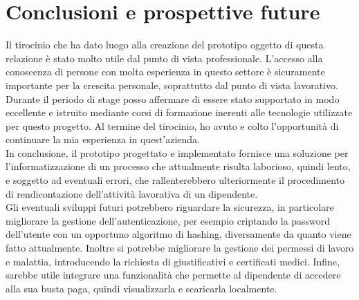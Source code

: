 \chapter{Conclusioni e prospettive future} \label{chapter:end}
Il tirocinio che ha dato luogo alla creazione del prototipo oggetto di questa relazione è stato molto utile dal punto di vista professionale. L'accesso alla conoscenza di persone con molta esperienza in questo settore è sicuramente importante per la crescita personale, soprattutto dal punto di vista lavorativo. Durante il periodo di stage posso affermare di essere stato supportato in modo eccellente e istruito mediante corsi di formazione inerenti alle tecnologie utilizzate per questo progetto. Al termine del tirocinio, ho avuto e colto l'opportunità di continuare la mia esperienza in quest'azienda.\\

In conclusione, il prototipo progettato e implementato fornisce una soluzione per l'informatizzazione di un processo che attualmente risulta laborioso, quindi lento, e soggetto ad eventuali errori, che rallenterebbero ulteriormente il procedimento di rendicontazione dell'attività lavorativa di un dipendente.\\ 

\noindent
Gli eventuali sviluppi futuri potrebbero riguardare la sicurezza, in particolare migliorare la gestione dell'autenticazione, per esempio criptando la password dell'utente con un opportuno algoritmo di hashing, diversamente da quanto viene fatto attualmente. Inoltre si potrebbe migliorare la gestione dei permessi di lavoro e malattia, introducendo la richiesta di giustificativi e certificati medici. Infine, sarebbe utile integrare una funzionalità che permette al dipendente di accedere alla sua busta paga, quindi visualizzarla e scaricarla localmente.

